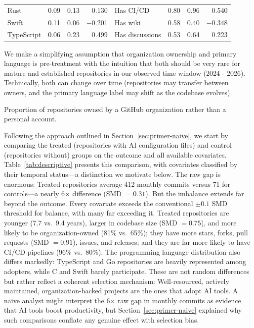 \begin{table}[t]
\begin{threeparttable}
\begin{tabular}{@{} l rrr l rrr @{}}
  Rust & 0.09 & 0.13 & 0.130 & Has CI/CD & 0.80 & 0.96 & 0.540 \\
  Swift & 0.11 & 0.06 & $-$0.201 & Has wiki & 0.58 & 0.40 & $-$0.348 \\
  TypeScript & 0.06 & 0.23 & 0.499 & Has discussions & 0.53 & 0.64 & 0.223 \\
  \bottomrule
  \end{tabular}
  \begin{tablenotes}\footnotesize
  \item[a] We make a simplifying assumption that organization ownership and primary language is pre-treatment with the intuition that both should be very rare for mature and established repositories in our observed time window (2024 - 2026). Technically, both can change over time (repositories may transfer between owners, and the primary language label may shift as the codebase evolves).
  \item[b] Proportion of repositories owned by a GitHub organization rather than a personal account.
  \end{tablenotes}
  \end{threeparttable}
\end{table}

Following the approach outlined in Section~\ref{sec:primer-naive}, we start by comparing the treated (repositories with AI configuration files) and control (repositories without) groups on the outcome and all available covariates.
Table~\ref{tab:descriptive} presents this comparison, with covariates classified by their temporal status---a distinction we motivate below.
The raw gap is enormous: Treated repositories average 412 monthly commits versus 71 for controls---a nearly 6$\times$ difference (SMD $= 0.31$).
But the imbalance extends far beyond the outcome.
Every covariate exceeds the conventional $\pm 0.1$ SMD threshold for balance, with many far exceeding it.
Treated repositories are younger (7.7 vs.\ 9.4 years), larger in codebase size (SMD $= 0.75$), and more likely to be organization-owned (81\% vs.\ 65\%); they have more stars, forks, pull requests (SMD $= 0.91$), issues, and releases; and they are far more likely to have CI/CD pipelines (96\% vs.\ 80\%).
The programming language distribution also differs markedly: TypeScript and Go repositories are heavily represented among adopters, while C and Swift barely participate.
These are not random differences but rather reflect a coherent selection mechanism: Well-resourced, actively maintained, organization-backed projects are the ones that adopt AI tools.
A na\"ive analyst might interpret the 6$\times$ raw gap in monthly commits as evidence that AI tools boost productivity, but Section~\ref{sec:primer-naive} explained why such comparisons conflate any genuine effect with selection bias.

